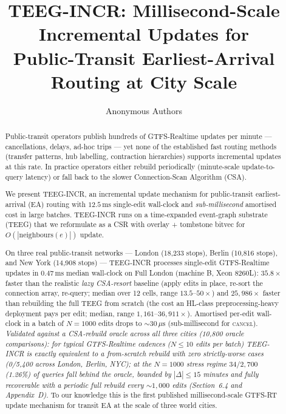 \documentclass[letterpaper]{article}
\title{TEEG-INCR: Millisecond-Scale Incremental Updates for\\
Public-Transit Earliest-Arrival Routing at City Scale}
\author{Anonymous Authors}
\theoremstyle{definition}
\theoremstyle{plain}
\begin{document}
\maketitle

\begin{abstract}
Public-transit operators publish hundreds of GTFS-Realtime updates per
minute --- cancellations, delays, ad-hoc trips --- yet none of the
established fast routing methods (transfer patterns, hub labelling,
contraction hierarchies) supports incremental updates at this rate.
In practice operators either rebuild periodically (minute-scale
update-to-query latency) or fall back to the slower
Connection-Scan Algorithm (CSA).

We present TEEG-INCR, an incremental update mechanism for
public-transit earliest-arrival (EA) routing with $12.5\,\mathrm{ms}$
single-edit wall-clock and \emph{sub-millisecond} amortised cost in
large batches. TEEG-INCR runs on a time-expanded event-graph
substrate (TEEG) that we reformulate as a CSR with overlay +
tombstone bitvec for $O(|\text{neighbours}(e)|)$ update.

On three real public-transit networks --- London (18{,}233 stops),
Berlin (10{,}816 stops), and New York (14{,}908 stops) --- TEEG-INCR
processes single-edit GTFS-Realtime updates in $0.47\,\mathrm{ms}$
median wall-clock on Full London (machine B, Xeon 8260L):
$35.8\times$ faster than the realistic \emph{lazy CSA-resort}
baseline (apply edits in place, re-sort the connection array,
re-query; median over 12 cells, range $13.5\text{--}50\times$) and
$25{,}986\times$ faster than rebuilding the full TEEG from scratch
(the cost an HL-class preprocessing-heavy deployment pays per edit;
median, range $1{,}161\text{--}36{,}911\times$). Amortised per-edit
wall-clock in a batch of $N\!=\!1000$ edits drops to
$\sim\!30\,\mu\mathrm{s}$ (sub-millisecond for \textsc{cancel}).
\emph{Validated against a CSA-rebuild oracle across all three cities
(10{,}800 oracle comparisons): for typical GTFS-Realtime cadences
($N \leq 10$ edits per batch) TEEG-INCR is exactly equivalent to a
from-scratch rebuild with zero strictly-worse cases (0/5{,}400 across
London, Berlin, NYC); at the $N\!=\!1000$ stress regime $34/2{,}700$
(1.26\%) of queries fall behind the oracle, bounded by
$|\Delta| \leq 15$ minutes and fully recoverable with a periodic
full rebuild every $\sim\!1{,}000$ edits (Section~6.4 and
Appendix~D).} To our knowledge this is the first published
millisecond-scale GTFS-RT update mechanism for transit EA at the
scale of three world cities.


\end{abstract}
\end{document}
